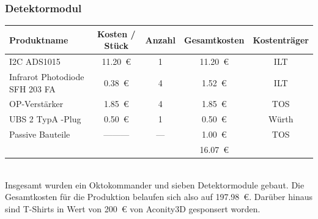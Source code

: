 \subsubsection*{Detektormodul} 
\begin{tabularx}{\textwidth}{p{4.5cm} | S c S c}
	Produktname 					& {Kosten / Stück}	& Anzahl & {Gesamtkosten}    	& Kostenträger \\ 
	\hline
	I2C ADS1015						& \SI{11.20}{€}  	&   1    & \SI{11.20}{€}	& ILT    \\ [2mm]
	Infrarot Photodiode SFH 203 FA	& \SI{0.38}{€}		&   4    & \SI{1.52}{€} 	& ILT	 \\ [8mm]
	OP-Verstärker    				& \SI{1.85}{€}   	&	4    & \SI{1.85}{€}  	& TOS    \\ [2mm]
	UBS 2 TypA -Plug				& \SI{0.50}{€}   	&   1    & \SI{0.50}{€} 	& Würth  \\ [2mm]
	Passive Bauteile    			& {---------}     	& {---}	 & \SI{1.00}{€}	   	& TOS    \\ [2mm]
	\hline
									&					&		 & \SI{16.07}{€}	&		
\end{tabularx} \\

\noindent
Insgesamt wurden ein Oktokommander und sieben Detektormodule gebaut. Die Gesamtkosten für die Produktion belaufen sich also auf \SI{197.98}{€}. Darüber hinaus sind T-Shirts in Wert von \SI{200}{€} von Aconity3D gesponsert worden.